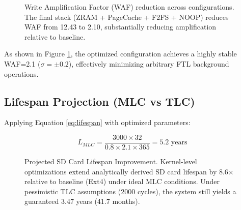 \documentclass[conference]{IEEEtran}
\begin{document}
\begin{figure}[t]
\centering
{}
\caption{Write Amplification Factor (WAF) reduction across configurations. The final stack (ZRAM + PageCache + F2FS + NOOP) reduces WAF from 12.43 to 2.10, substantially reducing amplification relative to baseline.}
\label{fig:waf_comparison}
\end{figure}

As shown in Figure \ref{fig:waf_comparison}, the optimized configuration achieves a highly stable WAF=2.1 ($\sigma=\pm 0.2$), effectively minimizing arbitrary FTL background operations.

\subsection{Lifespan Projection (MLC vs TLC)}

Applying Equation \ref{eq:lifespan} with optimized parameters:

\begin{equation}
L_{MLC} = \frac{3000 \times 32}{0.8 \times 2.1 \times 365} = 5.2 \text{ years}
\end{equation}

\begin{figure}[t]
\centering
{}
\caption{Projected SD Card Lifespan Improvement. Kernel-level optimizations extend analytically derived SD card lifespan by 8.6$\times$ relative to baseline (Ext4) under ideal MLC conditions. Under pessimistic TLC assumptions (2000 cycles), the system still yields a guaranteed 3.47 years (41.7 months).}
\label{fig:lifespan_projection}
\end{figure}
\end{document}
